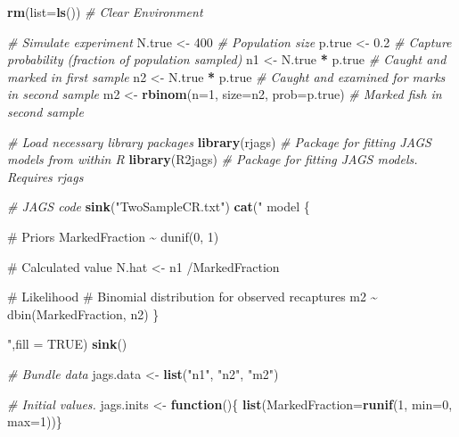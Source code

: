 \documentclass[
]{krantz}
\makeatletter
\newenvironment{Shaded}{\begin{snugshade}}{\end{snugshade}}
\newcommand{\AttributeTok}[1]{\textcolor[rgb]{0.27,0.27,0.27}{#1}}
\newcommand{\CommentTok}[1]{\textcolor[rgb]{0.37,0.37,0.37}{\textit{#1}}}
\newcommand{\ConstantTok}[1]{\textcolor[rgb]{0.37,0.37,0.37}{#1}}
\newcommand{\ControlFlowTok}[1]{\textcolor[rgb]{0.27,0.27,0.27}{\textbf{#1}}}
\newcommand{\DecValTok}[1]{\textcolor[rgb]{0.06,0.06,0.06}{#1}}
\newcommand{\FloatTok}[1]{\textcolor[rgb]{0.06,0.06,0.06}{#1}}
\newcommand{\FunctionTok}[1]{\textcolor[rgb]{0.27,0.27,0.27}{\textbf{#1}}}
\newcommand{\NormalTok}[1]{#1}
\newcommand{\OtherTok}[1]{\textcolor[rgb]{0.37,0.37,0.37}{#1}}
\newcommand{\SpecialCharTok}[1]{\textcolor[rgb]{0.43,0.43,0.43}{\textbf{#1}}}
\newcommand{\StringTok}[1]{\textcolor[rgb]{0.5,0.5,0.5}{#1}}
\newenvironment{kframe}{%
\medskip{}
\setlength{\fboxsep}{.8em}
 \def\at@end@of@kframe{}%
 \ifinner\ifhmode%
  \def\at@end@of@kframe{\end{minipage}}%
  \begin{minipage}{\columnwidth}%
 \fi\fi%
 \def\FrameCommand##1{\hskip\@totalleftmargin \hskip-\fboxsep
 \colorbox{shadecolor}{##1}\hskip-\fboxsep
     \hskip-\linewidth \hskip-\@totalleftmargin \hskip\columnwidth}%
 \MakeFramed {\advance\hsize-\width
   \@totalleftmargin\z@ \linewidth\hsize
   \@setminipage}}%
 {\par\unskip\endMakeFramed%
 \at@end@of@kframe}
\renewenvironment{Shaded}{\begin{kframe}}{\end{kframe}}
\makeatother
\begin{document}
\begin{Shaded}
\begin{Highlighting}[]
\FunctionTok{rm}\NormalTok{(}\AttributeTok{list=}\FunctionTok{ls}\NormalTok{()) }\CommentTok{\# Clear Environment}

\CommentTok{\# Simulate experiment}
\NormalTok{N.true }\OtherTok{\textless{}{-}} \DecValTok{400}  \CommentTok{\# Population size}
\NormalTok{p.true }\OtherTok{\textless{}{-}} \FloatTok{0.2} \CommentTok{\# Capture probability (fraction of population sampled)}
\NormalTok{n1 }\OtherTok{\textless{}{-}}\NormalTok{ N.true }\SpecialCharTok{*}\NormalTok{ p.true }\CommentTok{\# Caught and marked in first sample}
\NormalTok{n2 }\OtherTok{\textless{}{-}}\NormalTok{ N.true }\SpecialCharTok{*}\NormalTok{ p.true }\CommentTok{\# Caught and examined for marks in second sample}
\NormalTok{m2 }\OtherTok{\textless{}{-}} \FunctionTok{rbinom}\NormalTok{(}\AttributeTok{n=}\DecValTok{1}\NormalTok{, }\AttributeTok{size=}\NormalTok{n2, }\AttributeTok{prob=}\NormalTok{p.true) }\CommentTok{\# Marked fish in second sample}

\CommentTok{\# Load necessary library packages}
\FunctionTok{library}\NormalTok{(rjags)   }\CommentTok{\# Package for fitting JAGS models from within R}
\FunctionTok{library}\NormalTok{(R2jags)  }\CommentTok{\# Package for fitting JAGS models. Requires rjags}

\CommentTok{\# JAGS code}
\FunctionTok{sink}\NormalTok{(}\StringTok{"TwoSampleCR.txt"}\NormalTok{)}
\FunctionTok{cat}\NormalTok{(}\StringTok{"}
\StringTok{    model \{}

\StringTok{    \# Priors}
\StringTok{    MarkedFraction \textasciitilde{} dunif(0, 1)}

\StringTok{    \# Calculated value}
\StringTok{    N.hat \textless{}{-} n1 /MarkedFraction}

\StringTok{    \# Likelihood}
\StringTok{    \# Binomial distribution for observed recaptures}
\StringTok{    m2 \textasciitilde{} dbin(MarkedFraction, n2)}
\StringTok{    \}}

\StringTok{    "}\NormalTok{,}\AttributeTok{fill =} \ConstantTok{TRUE}\NormalTok{)}
\FunctionTok{sink}\NormalTok{()}

\CommentTok{\# Bundle data}
\NormalTok{jags.data }\OtherTok{\textless{}{-}} \FunctionTok{list}\NormalTok{(}\StringTok{"n1"}\NormalTok{, }\StringTok{"n2"}\NormalTok{, }\StringTok{"m2"}\NormalTok{)}

\CommentTok{\# Initial values.}
\NormalTok{jags.inits }\OtherTok{\textless{}{-}} \ControlFlowTok{function}\NormalTok{()\{ }\FunctionTok{list}\NormalTok{(}\AttributeTok{MarkedFraction=}\FunctionTok{runif}\NormalTok{(}\DecValTok{1}\NormalTok{, }\AttributeTok{min=}\DecValTok{0}\NormalTok{, }\AttributeTok{max=}\DecValTok{1}\NormalTok{))\}}


\end{Highlighting}
\end{Shaded}
\end{document}
